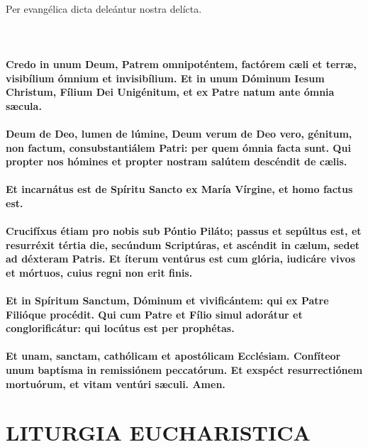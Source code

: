 \documentclass[12pt, a4paper]{article}
\begin{document}
	\\
	Per evangélica dicta deleántur
	nostra delícta.
	\\\\
	\\
	\\
	\textbf{Credo in unum Deum, Patrem
	omnipoténtem, factórem cæli et
	terræ, visibílium ómnium et
	invisibílium. Et in unum Dóminum
	Iesum Christum, Fílium Dei
	Unigénitum, et ex Patre natum ante
	ómnia sæcula.}
	\\\\
	\textbf{Deum de Deo, lumen de lúmine,
	Deum verum de Deo vero,
	génitum, non factum,
	consubstantiálem Patri: per quem
	ómnia facta sunt. Qui propter nos
	hómines et propter nostram
	salútem descéndit de cælis.}
	\\\\
	\textbf{Et incarnátus est de Spíritu Sancto
	ex María Vírgine, et homo factus
	est.}
	\\\\
	\textbf{Crucifíxus étiam pro nobis sub
	Póntio Piláto; passus et sepúltus
	est, et resurréxit tértia die,
	secúndum Scriptúras, et ascéndit in
	cælum, sedet ad déxteram Patris. Et
	íterum ventúrus est cum glória,
	iudicáre vivos et mórtuos, cuius
	regni non erit finis.}
	\\\\
	\textbf{Et in Spíritum Sanctum, Dóminum
	et vivificántem:
	qui ex Patre Filióque procédit.
	Qui cum Patre et Fílio simul
	adorátur et conglorificátur:
	qui locútus est per prophétas.}
	\\\\
	\textbf{Et unam, sanctam, cathólicam et
	apostólicam Ecclésiam. Confíteor
	unum baptísma in remissiónem
	peccatórum. Et exspéct
	resurrectiónem mortuórum, et
	vitam ventúri sæculi. Amen.}

	\newpage
	
	\section*{LITURGIA EUCHARISTICA}
	
\end{document}
